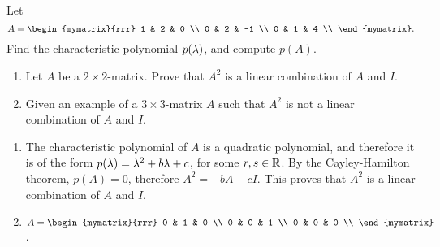 \begin{enumialphparenastyle}
\begin{ex}
  Let
  \begin{equation*}
    A = \begin{mymatrix}{rrr}
      1 & 2 & 0 \\
      0 & 2 & -1 \\
      0 & 1 & 4 \\
    \end{mymatrix}.
  \end{equation*}
  Find the characteristic polynomial $p(\lambda)$, and compute
  $p(A)$.
\end{ex}

\begin{ex}
  \begin{enumerate}
  \item Let $A$ be a $2\times 2$-matrix. Prove that $A^2$ is a linear
    combination of $A$ and $I$.
  \item Given an example of a $3\times 3$-matrix $A$ such that $A^2$
    is not a linear combination of $A$ and $I$.
  \end{enumerate}
  \begin{sol}
    \begin{enumerate}
    \item The characteristic polynomial of $A$ is a quadratic
      polynomial, and therefore it is of the form
      $p(\lambda) = \lambda^2 + b\lambda + c$, for some
      $r,s\in\mathbb{R}$. By the Cayley-Hamilton theorem, $p(A)=0$, therefore
      $A^2 = -bA - cI$. This proves that $A^2$ is a linear combination
      of $A$ and $I$.
    \item $A=\begin{mymatrix}{rrr}
        0 & 1 & 0 \\
        0 & 0 & 1 \\
        0 & 0 & 0 \\
      \end{mymatrix}$.
    \end{enumerate}
  \end{sol}
\end{ex}

\end{enumialphparenastyle}
